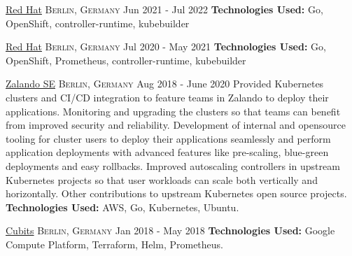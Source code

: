 \documentclass[10pt,a4paper]{article}
\begin{document}
\headedsection
{\href{https://redhat.com/}{Red Hat}}
{\textsc{Berlin, Germany}}
{
	\headedsubsection
	{}
	{Jun 2021 - Jul 2022}
	{
		\textbf{Technologies Used:} Go, OpenShift, controller-runtime, kubebuilder
	}
}

\headedsection
{\href{https://redhat.com/}{Red Hat}}
{\textsc{Berlin, Germany}}
{
	\headedsubsection
	{}
	{Jul 2020 - May 2021}
	{
		\textbf{Technologies Used:} Go, OpenShift, Prometheus, controller-runtime, kubebuilder
	}
}

\headedsection
{\href{https://zalando.de/}{Zalando SE}}
{\textsc{Berlin, Germany}}
{
	\headedsubsection
	{}
	{Aug 2018 - June 2020}
	{\bodytext
		{
			Provided Kubernetes clusters and CI/CD integration to feature teams
			in Zalando to deploy their applications. Monitoring and upgrading
			the clusters so that teams can benefit from improved security and
			reliability.  Development of internal and opensource tooling for
			cluster users to deploy their applications seamlessly and perform
			application deployments with advanced features like pre-scaling,
			blue-green deployments and easy rollbacks. Improved autoscaling
			controllers in upstream Kubernetes projects so that user workloads
			can scale both vertically and horizontally. Other contributions to
			upstream Kubernetes open source projects.
		}
		\textbf{Technologies Used:} AWS, Go, Kubernetes, Ubuntu.
	}
}

\headedsection
{\href{https://cubits.com/}{Cubits}}
{\textsc{Berlin, Germany}}
{
	\headedsubsection
	{}
	{Jan 2018 - May 2018}
	{
		\textbf{Technologies Used:} Google Compute Platform, Terraform, Helm,
		Prometheus.
	}
}
\end{document}

